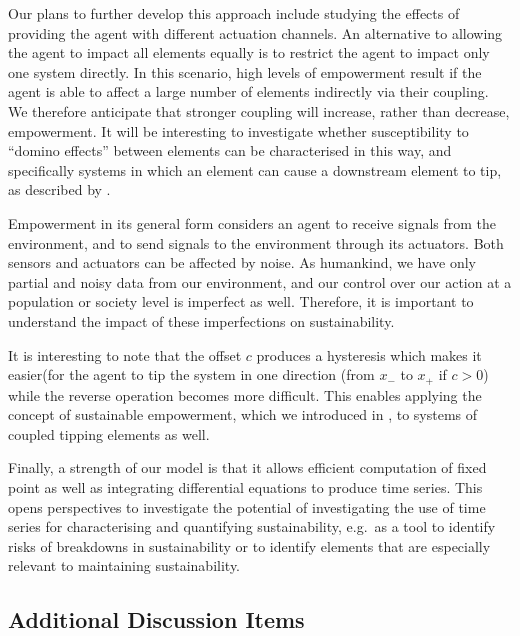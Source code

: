 \documentclass[letterpaper]{article}
\begin{document}
Our plans to further develop this approach include studying the
effects of providing the agent with different actuation channels. An
alternative to allowing the agent to impact all elements equally is to
restrict the agent to impact only one system directly. In this
scenario, high levels of empowerment result if the agent is able to
affect a large number of elements indirectly via their coupling. We
therefore anticipate that stronger coupling will increase, rather than
decrease, empowerment. It will be interesting to investigate whether
susceptibility to ``domino effects'' between elements can be
characterised in this way, and specifically systems in which an
element can cause a downstream element to tip, as described by
\citet{Brummitt2015_coupledcatastrophes}.

Empowerment in its general form considers an agent to receive signals
from the environment, and to send signals to the environment through
its actuators. Both sensors and actuators can be affected by noise. As
humankind, we have only partial and noisy data from our environment,
and our control over our action at a population or society level is
imperfect as well. Therefore, it is important to understand the impact
of these imperfections on sustainability.



It is interesting to note that the offset $c$ produces a hysteresis
which makes it easier(for the agent to tip the system in one direction
(from $x_{-}$ to $x_{+}$ if $c > 0$) while the reverse operation
becomes more difficult. This enables applying the concept of
sustainable empowerment, which we introduced in
\citet{Kim2009_sustainability}, to systems of coupled tipping elements
as well.

Finally, a strength of our model is that it allows efficient
computation of fixed point as well as integrating differential
equations to produce time series. This opens perspectives to
investigate the potential of investigating the use of time series for
characterising and quantifying sustainability, e.g.\ as a tool to
identify risks of breakdowns in sustainability or to identify elements
that are especially relevant to maintaining sustainability.


\subsection{Additional Discussion Items}
\end{document}
